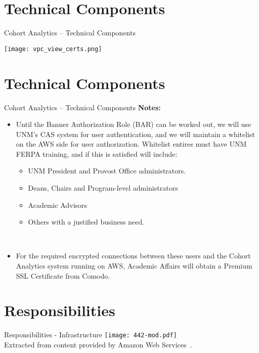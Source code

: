 \documentclass[t]{beamer}   %
\begin{document}
\section{Technical Components}%
\begin{frame}{Cohort Analytics -- Technical Components}
\vspace*{0.25in}
  \centerline{\texttt{[image: vpc\_view\_certs.png]}}
\end{frame}

\section{Technical Components}%
\begin{frame}{Cohort Analytics -- Technical Components}
\vspace*{-0.15in}
\textbf{Notes:}
\begin{itemize}
 \item Until the Banner Authorization Role (BAR) can be worked out, we will use UNM's CAS system for user authentication, and we will maintain a whitelist on the AWS side for user authorization. 
 \pause Whitelist entires must have UNM FERPA training, and if this is satisfied will include:
 \begin{itemize}
  \item UNM President and Provost Office administrators.
  \pause
  \item Deans, Chairs and Program-level administrators
  \pause
  \item Academic Advisors
  \pause
  \item Others with a justified business need.
 \end{itemize}~\\
  \pause
 \item For the required encrypted connections between these users and the Cohort Analytics system running on AWS, Academic Affairs will obtain a Premium SSL Certificate from Comodo.
\end{itemize}
\end{frame}


\section{Responsibilities}%
\begin{frame}{Responsibilities - Infrastructure}
 	\texttt{[image: 442-mod.pdf]} \\
 	{\tiny Extracted from content provided by Amazon Web Services~.}
\end{frame}
\end{document}
